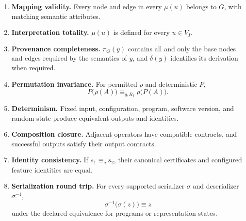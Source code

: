 \begin{enumerate}
  \item \textbf{Mapping validity.} Every node and edge in every \(\mu(u)\)
    belongs to \(G\), with matching semantic attributes.
  \item \textbf{Interpretation totality.} \(\mu(u)\) is defined for every
    \(u\in V_I\).
  \item \textbf{Provenance completeness.} \(\pi_G(y)\) contains all and only
    the base nodes and edges required by the semantics of \(y\), and
    \(\delta(y)\) identifies its derivation when required.
  \item \textbf{Permutation invariance.} For permitted \(\rho\) and
    deterministic \(P\),
    \begin{equation}
      P\bigl(\rho(A)\bigr)\equiv_{q,R_I}\rho\bigl(P(A)\bigr).
    \end{equation}
  \item \textbf{Determinism.} Fixed input, configuration, program, software
    version, and random state produce equivalent outputs and identities.
  \item \textbf{Composition closure.} Adjacent operators have compatible
    contracts, and successful outputs satisfy their output contracts.
  \item \textbf{Identity consistency.} If \(s_1\equiv_q s_2\), their
    canonical certificates and configured feature identities are equal.
  \item \textbf{Serialization round trip.} For every supported serializer
    \(\sigma\) and deserializer \(\sigma^{-1}\),
    \begin{equation}
      \sigma^{-1}\bigl(\sigma(z)\bigr)\equiv z
    \end{equation}
    under the declared equivalence for programs or representation states.
\end{enumerate}
